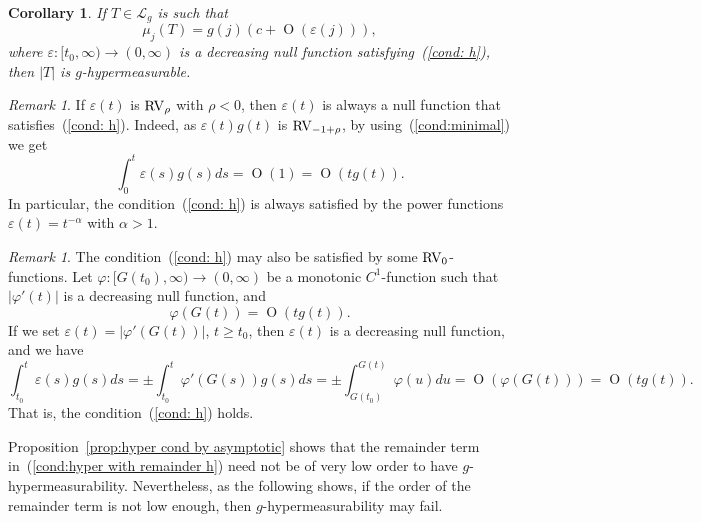 \documentclass[10pt, a4paper]{amsart}
\newcommand{\sL}{\mathscr{L}}
\newcommand{\op}{\operatorname}
\numberwithin{equation}{section}
\newtheorem{corollary}[theorem]{Corollary}
\theoremstyle{definition}
\theoremstyle{remark}
\newtheorem{remark}[theorem]{Remark}
\newcommand{\RV}{\textup{RV}}
\begin{document}
\begin{corollary}
 If $T\in \sL_g$ is such that
\begin{equation*}
 \mu_j(T)= g(j)\left(c + \op{O}\left( \varepsilon(j)\right)\right),
\end{equation*}
where $\varepsilon:[t_0,\infty)\rightarrow (0,\infty)$ is a decreasing null function satisfying~(\ref{cond: h}), then $|T|$ is $g$-hypermeasurable.
\end{corollary}

\begin{remark}\label{rmk:Hyper.RV-neg-eps-hyper}
 If $\varepsilon(t)$ is $\RV_{\rho}$ with $\rho<0$, then $\varepsilon(t)$ is always a null function that satisfies~(\ref{cond: h}). Indeed, as $\varepsilon(t)g(t)$ is $\RV_{-1+\rho}$, 
 by using~(\ref{cond:minimal}) we get 
 \begin{equation*}
 \int_0^t \varepsilon(s)g(s)ds = \op{O}(1)= \op{O}(tg(t)).
\end{equation*}
In particular, the condition~(\ref{cond: h}) is always satisfied by the power functions $\varepsilon(t)=t^{-\alpha}$ with $\alpha>1$.
\end{remark}

\begin{remark}\label{rmk:2nd h}
 The condition~(\ref{cond: h}) may also be satisfied by some $\RV_0$-functions. Let $\varphi:[G(t_0),\infty)\rightarrow (0,\infty)$ be a monotonic $C^1$-function such that $|\varphi'(t)|$ is a decreasing null function, and
 \begin{equation*}
 \varphi(G(t))=\op{O}(tg(t)).
\end{equation*}
If we set $\varepsilon(t)=|\varphi'(G(t))|$, $t\geq t_0$, then $\varepsilon(t)$ is a decreasing null function, and we have
\begin{equation*}
 \int_{t_0}^t \varepsilon(s)g(s)ds= \pm \int_{t_0}^t \varphi'(G(s))g(s)ds= \pm \int_{G(t_0)}^{G(t)} \varphi(u)du=\op{O}\left(\varphi(G(t))\right)=\op{O}(tg(t)).
\end{equation*}
That is, the condition~(\ref{cond: h}) holds.
\end{remark}

Proposition~\ref{prop:hyper cond by asymptotic} shows that the remainder term in~(\ref{cond:hyper with remainder h}) need not be of very low order to have $g$-hypermeasurability. Nevertheless, as the following shows, if the order of the remainder term is not low enough, then $g$-hypermeasurability may fail.
\end{document}
